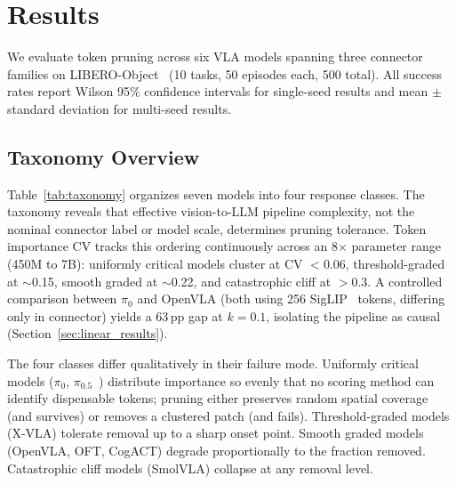 \section{Results}
\label{sec:results}

We evaluate token pruning across six VLA models spanning three connector families on LIBERO-Object~\cite{liu2023libero} (10 tasks, 50 episodes each, 500 total). All success rates report Wilson 95\% confidence intervals for single-seed results and mean $\pm$ standard deviation for multi-seed results.

\subsection{Taxonomy Overview}
\label{sec:taxonomy_overview}

Table~\ref{tab:taxonomy} organizes seven models into four response classes. The taxonomy reveals that effective vision-to-LLM pipeline complexity, not the nominal connector label or model scale, determines pruning tolerance. Token importance CV tracks this ordering continuously across an 8$\times$ parameter range (450M to 7B): uniformly critical models cluster at CV $< 0.06$, threshold-graded at $\sim$0.15, smooth graded at $\sim$0.22, and catastrophic cliff at $>$0.3. A controlled comparison between $\pi_0$ and OpenVLA (both using 256 SigLIP~\cite{zhai2023siglip} tokens, differing only in connector) yields a 63\,pp gap at $k{=}0.1$, isolating the pipeline as causal (Section~\ref{sec:linear_results}).

The four classes differ qualitatively in their failure mode. Uniformly critical models ($\pi_0$, $\pi_0.5$~\cite{black2025pi05}) distribute importance so evenly that no scoring method can identify dispensable tokens; pruning either preserves random spatial coverage (and survives) or removes a clustered patch (and fails). Threshold-graded models (X-VLA) tolerate removal up to a sharp onset point. Smooth graded models (OpenVLA, OFT, CogACT) degrade proportionally to the fraction removed. Catastrophic cliff models (SmolVLA) collapse at any removal level.

